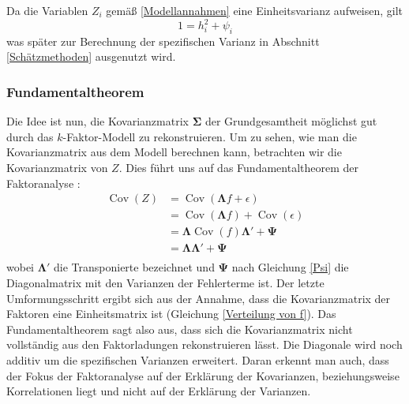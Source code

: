 \documentclass[11pt]{scrartcl}
\DeclareMathOperator{\Cov}{Cov}
\begin{document}
	Da die Variablen $Z_i$ gemäß \ref{Modellannahmen} eine Einheitsvarianz
	aufweisen, gilt 
	\begin{equation} \label{Varianzzerlegung Ergebnis}
		1 = h_i^2 + \psi_i
	\end{equation}
	was später zur Berechnung der spezifischen Varianz
	in Abschnitt \ref{Schätzmethoden} ausgenutzt wird.
	\subsubsection{Fundamentaltheorem}
	
	Die Idee ist nun, die Kovarianzmatrix $\mathbf{\Sigma}$ der Grundgesamtheit
	möglichst
	gut durch das $k$-Faktor-Modell zu rekonstruieren. Um zu sehen, wie man die
	Kovarianzmatrix
	aus dem Modell berechnen kann, betrachten wir die Kovarianzmatrix von $Z$.
	Dies führt uns auf das Fundamentaltheorem der Faktoranalyse \parencite[412]{Rencher.2002}:
	\begin{equation} \label{fundamentaltheorem}
		\begin{split} 
			\Cov(Z) &= \Cov(\mathbf{\Lambda}f + \epsilon) \\
			&= \Cov(\mathbf{\Lambda}f) + \Cov(\epsilon) \\
			&= \mathbf{\Lambda}\Cov(f) \mathbf{\Lambda'} + \mathbf{\Psi} \\
			&= \mathbf{\Lambda\Lambda'} + \mathbf{\Psi} \\ 
		\end{split}
	\end{equation}
	wobei $\mathbf{\Lambda}'$ die Transponierte bezeichnet und $\mathbf{\Psi}$ nach Gleichung \ref{Psi} die Diagonalmatrix mit den
	Varianzen der Fehlerterme ist. Der letzte Umformungsschritt ergibt sich aus der Annahme,
	dass die Kovarianzmatrix der Faktoren eine Einheitsmatrix ist (Gleichung \ref{Verteilung von f}).
	Das Fundamentaltheorem sagt also aus, dass sich
	die Kovarianzmatrix nicht vollständig aus den Faktorladungen rekonstruieren
	lässt. Die Diagonale wird noch additiv um die spezifischen Varianzen erweitert.
	Daran erkennt man auch, dass der Fokus der Faktoranalyse auf der Erklärung
	der Kovarianzen, beziehungsweise Korrelationen liegt und nicht auf der Erklärung
	der Varianzen.
	
\end{document}
